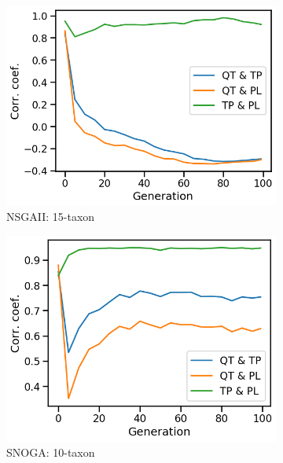 \begin{figure}[!htbp]
\begin{adjustwidth}{-1cm}{-1cm}
\begin{subfigure}[b]{0.4\textwidth}
			\includegraphics[width=\textwidth]{Figure/15-taxon_NSGAII_corr_plot}
			\caption{NSGAII: 15-taxon}
		\end{subfigure}    
		\begin{subfigure}[b]{0.4\textwidth}
			\includegraphics[width=\textwidth]{Figure/10-taxon_NOSSGA_corr_plot}
			\caption{SNOGA: 10-taxon}
		\end{subfigure}%
		\begin{subfigure}[b]{0.4\textwidth}

\end{subfigure}
\end{adjustwidth}
\end{figure}
